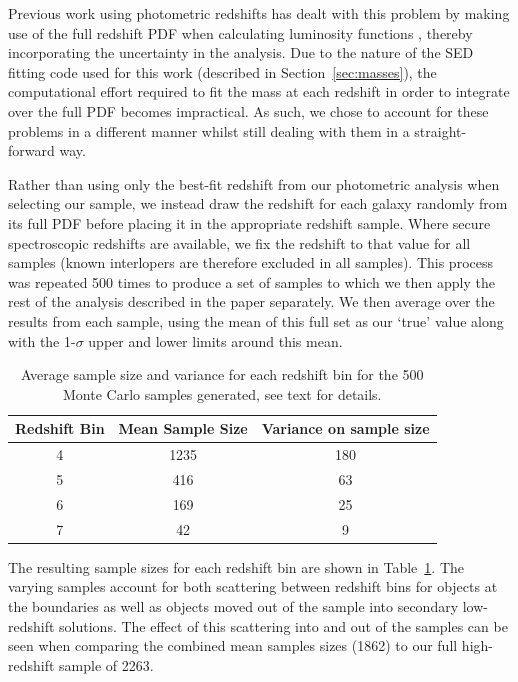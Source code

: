Previous work using photometric redshifts has dealt with this problem by making use of the full redshift PDF when calculating luminosity functions \citep{2005ApJ...631..126D,2009MNRAS.395.2196M,McLure:2013hh}, thereby incorporating the uncertainty in the analysis. Due to the nature of the SED fitting code used for this work (described in Section~\ref{sec:masses}), the computational effort required to fit the mass at each redshift in order to integrate over the full PDF becomes impractical. As such, we chose to account for these problems in a different manner whilst still dealing with them in a straight-forward way. 

Rather than using only the best-fit redshift from our photometric analysis when selecting our sample, we instead draw the redshift for each galaxy randomly from its full PDF before placing it in the appropriate redshift sample. Where secure spectroscopic redshifts are available, we fix the redshift to that value for all samples (known interlopers are therefore excluded in all samples). This process was repeated 500 times to produce a set of samples to which we then apply the rest of the analysis described in the paper separately. We then average over the results from each sample, using the mean of this full set as our `true' value along with the 1-$\sigma$ upper and lower limits around this mean. 

\begin{table}
\caption{Average sample size and variance for each redshift bin for the 500 Monte Carlo samples generated, see text for details.}
\label{tab:samplesizes}
\begin{tabular}{@{}ccc}
\hline
 Redshift Bin & Mean Sample Size & Variance on sample size  \\
  \hline
 4 & 1235 & 180 \\
 5 & 416 & 63 \\
 6 & 169 & 25 \\
 7 & 42 & 9 \\
 \hline
\end{tabular}
\end{table}

The resulting sample sizes for each redshift bin are shown in Table~\ref{tab:samplesizes}. The varying samples account for both scattering between redshift bins for objects at the boundaries as well as objects moved out of the sample into secondary low-redshift solutions. The effect of this scattering into and out of the samples can be seen when comparing the combined mean samples sizes (1862) to our full high-redshift sample of 2263.

